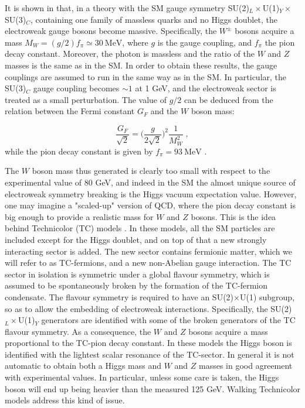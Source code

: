 It is shown in \cite{Susskind:1978ms} that, in a theory with the SM gauge symmetry SU(2)$_L\times$U(1)$_Y\times$SU(3)$_C$, containing one family of massless quarks and no Higgs doublet, the electroweak gauge bosons become massive.
Specifically, the $W^{\pm}$ bosons acquire a mass $M_{W} = (g/2) f_{\pi} \simeq 30 \: \mathrm{MeV}$, where $g$ is the \suEW gauge coupling, and $f_{\pi}$ the pion decay constant. Moreover, the photon is massless and the ratio of the $W$ and $Z$ masses is the same as in the SM. In order to obtain these results, the gauge couplings are assumed to run in the same way as in the SM. In particular, the SU(3)$_C$ gauge coupling becomes $\sim 1$ at 1 GeV, and the electroweak sector is treated as a small perturbation. The value of $g/2$ can be deduced from the relation between the Fermi constant $G_F$ and the $W$ boson mass:

\begin{equation}
\frac{G_F}{\sqrt 2} = \biggl( \frac{g}{2 \sqrt 2} \biggr)^2 \frac{1}{M_W^2}  \; ,
\end{equation} 
%
while the pion decay constant is given by $f_{\pi} = 93 \: \mathrm{MeV}$ \cite{Peskin:1995ev}.

The $W$ boson mass thus generated is clearly too small with respect to the experimental value of 80 GeV, and indeed in the SM the almost unique source of electroweak symmetry breaking is the Higgs vacuum expectation value. However, one may imagine a "scaled-up" version of QCD, where the pion decay constant is big enough to provide a realistic mass for $W$ and $Z$ bosons. This is the idea behind Technicolor (TC) models \cite{Weinberg:1975gm,Susskind:1978ms}. In these models, all the SM particles are included except for the Higgs doublet, and on top of that a new strongly interacting sector is added. The new sector contains fermionic matter, which we will refer to as TC-fermions, and a new non-Abelian gauge interaction. The TC sector in isolation is symmetric under a global flavour symmetry, which is assumed to be spontaneously broken by the formation of the TC-fermion condensate. The flavour symmetry is required to have an SU(2)$\times$U(1) subgroup, so as to allow the embedding of electroweak interactions. Specifically, the SU(2)$_L\times$U(1)$_Y$ generators are identified with some of the broken generators of the TC flavour symmetry. As a consequence, the $W$ and $Z$ bosons acquire a mass proportional to the TC-pion decay constant. In these models the Higgs boson is identified with the lightest scalar resonance of the TC-sector. In general it is not automatic to obtain both a Higgs mass and $W$ and $Z$ masses in good agreement with experimental values. In particular, unless some care is taken, the Higgs boson will end up being heavier than the measured 125 GeV. Walking Technicolor models \cite{Holdom:1981rm,Yamawaki:1985zg,Dietrich:2005jn,Appelquist:2010gy} address this kind of issue.

